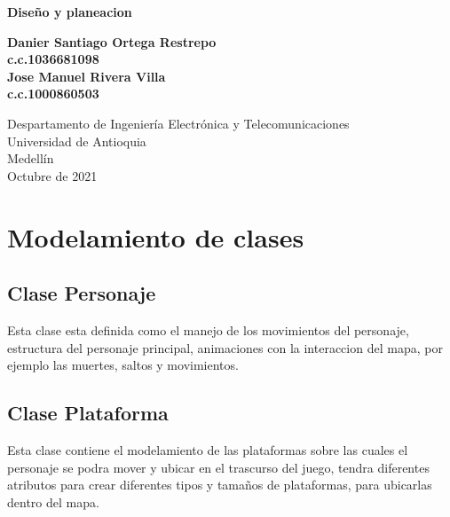 \documentclass{article}
\begin{document}
\begin{titlepage}
    \begin{center}
        \vspace*{1cm}
            
        \Huge
        \textbf{Diseño y planeacion}
            
        \vspace{0.5cm}
        \LARGE
            
        \vspace{1.5cm}
            
        \textbf{Danier Santiago Ortega Restrepo}\\
        \textbf{c.c.1036681098}\\
        
        \textbf{Jose Manuel Rivera Villa}\\
        \textbf{c.c.1000860503}
            
        \vfill
            
        \vspace{0.8cm}
            
        \Large
        Despartamento de Ingeniería Electrónica y Telecomunicaciones\\
        Universidad de Antioquia\\
        Medellín\\
       Octubre de 2021
            
    \end{center}
\end{titlepage}

\newpage
\tableofcontents
\section{Modelamiento de clases}
\subsection{Clase Personaje}
Esta clase esta definida como el manejo de los movimientos del personaje, estructura del personaje principal, animaciones con la interaccion del mapa, por ejemplo las muertes, saltos y movimientos.
\subsection{Clase Plataforma}
Esta clase contiene el modelamiento de las plataformas sobre las cuales el personaje se podra mover y ubicar en el trascurso del juego, tendra diferentes atributos para crear diferentes tipos y tamaños de plataformas, para ubicarlas dentro del mapa.
\end{document}
